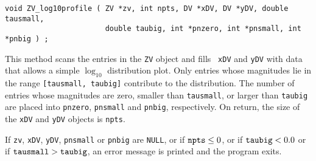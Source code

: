 \begin{enumerate}
\begin{verbatim}
void ZV_log10profile ( ZV *zv, int npts, DV *xDV, DV *yDV, double tausmall, 
                       double taubig, int *pnzero, int *pnsmall, int *pnbig ) ;
\end{verbatim}
This method scans the entries in the {\tt ZV} object and fills {\tt
xDV} and {\tt yDV} with data that allows a simple $\log_{10}$ 
distribution plot.
Only entries whose magnitudes lie in the range {\tt [tausmall, taubig]}
contribute to the distribution.
The number of entries whose magnitudes are zero, 
smaller than {\tt tausmall},
or larger than {\tt taubig} 
are placed into {\tt pnzero}, {\tt *pnsmall} and {\tt *pnbig},
respectively.
On return, the size of the {\tt xDV} and {\tt yDV} objects 
is {\tt npts}.
\par {}
If {\tt zv}, {\tt xDV}, {\tt yDV}, {\tt pnsmall} or {\tt pnbig} are
{\tt NULL}, or if ${\tt npts} \le 0$, 
or if ${\tt taubig} < 0.0$
or if ${\tt tausmall} > {\tt taubig}$,
an error message is printed and the program exits.
\end{enumerate}
\par
